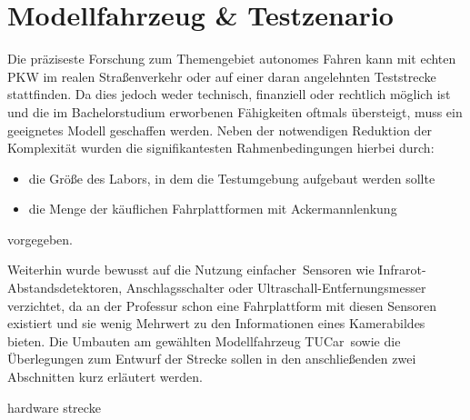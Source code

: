 \chapter{Modellfahrzeug \& Testzenario \dcsecondauthorshort}
\label{cha:fahrzeug_szenario}

Die präziseste Forschung zum Themengebiet autonomes Fahren kann mit echten PKW im realen Straßenverkehr oder auf einer daran angelehnten Teststrecke stattfinden. Da dies jedoch weder technisch, finanziell oder rechtlich möglich ist und die im Bachelorstudium erworbenen Fähigkeiten oftmals übersteigt, muss ein geeignetes Modell geschaffen werden. Neben der notwendigen Reduktion der Komplexität wurden die signifikantesten Rahmenbedingungen hierbei durch:
\begin{itemize}
\item die Größe des Labors, in dem die Testumgebung aufgebaut werden sollte
\item die Menge der käuflichen Fahrplattformen mit Ackermannlenkung
\end{itemize}
vorgegeben. 

Weiterhin wurde bewusst auf die Nutzung \glqq einfacher\grqq\ Sensoren wie Infrarot-Abstandsdetektoren, Anschlagsschalter oder Ultraschall-Entfernungsmesser verzichtet, da an der Professur schon eine Fahrplattform mit diesen Sensoren existiert und sie wenig Mehrwert zu den Informationen eines Kamerabildes bieten. Die Umbauten am gewählten Modellfahrzeug \glqq TUCar\grqq\ sowie die Überlegungen zum Entwurf der Strecke sollen in den anschließenden zwei Abschnitten kurz erläutert werden.

{hardware}
{strecke}
